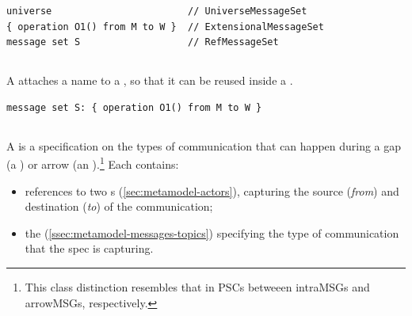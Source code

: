 \begin{lstlisting}[style=Example]
universe                        // UniverseMessageSet
{ operation O1() from M to W }  // ExtensionalMessageSet
message set S                   // RefMessageSet
\end{lstlisting}

\subsection{\mnamedmessageset}\label{ssec:metamodel-messages-named-sets}

A \mnamedmessageset{} attaches a name to a \mmessageset, so that it can be reused
inside a \msequence.

\begin{lstlisting}[style=Example]
message set S: { operation O1() from M to W }
\end{lstlisting}

\subsection{\mmessagespec}

A \mmessagespec{} is a specification on the types of communication that can
happen during a gap (a \mgapmessagespec) or arrow (an \marrowmessagespec).\footnote{
This class distinction resembles that in PSCs betweeen intraMSGs and arrowMSGs,
respectively.}  Each \mmessagespec{} contains:

\begin{itemize}
\item
	references to two \mactor s (\cref{sec:metamodel-actors}),
	capturing the source (\emph{from}) and destination (\emph{to})
	of the communication;
\item
	the \mmessagetopic{} (\cref{ssec:metamodel-messages-topics}) specifying
	the type of communication that the spec is capturing.
\end{itemize}

